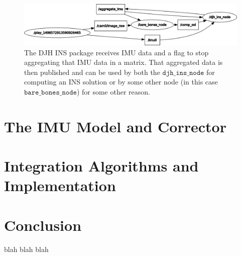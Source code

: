 \documentclass[11pt,a4paper]{article}
\begin{document}
\begin{figure}
	\centering
	\includegraphics[scale=0.425]{djhinsagg}
	\caption{The DJH INS package receives IMU data and a flag to stop aggregating that IMU data in a matrix. That aggregated data is then published and can be used by both the $\texttt{djh\_ins\_node}$ for computing an INS solution or by some other node (in this case $\texttt{bare\_bones\_node}$) for some other reason.}
	\label{fig:djhinsagg}
\end{figure}

\section{The IMU Model and Corrector}

\section{Integration Algorithms and Implementation}

\section{Conclusion}

blah blah blah \cite{Trawny:2005,Forster:2017,Forster:2015,Eckenhoff:2016}



\end{document}
